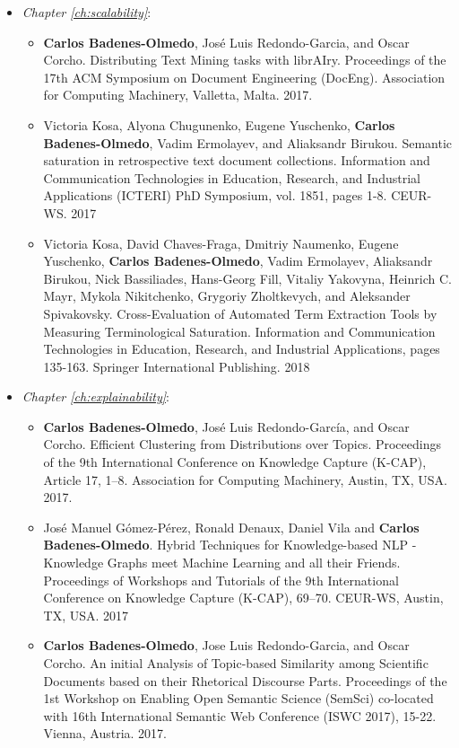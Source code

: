 \begin{itemize}
\item \textit{Chapter \ref{ch:scalability}}:
\begin{itemize}
\item \textbf{Carlos Badenes-Olmedo}, José Luis Redondo-Garcia, and Oscar Corcho. Distributing Text Mining tasks with librAIry. Proceedings of the 17th ACM Symposium on Document Engineering (DocEng). Association for Computing Machinery, Valletta, Malta. 2017.
\item Victoria Kosa, Alyona Chugunenko, Eugene Yuschenko, \textbf{Carlos Badenes-Olmedo}, Vadim Ermolayev, and Aliaksandr Birukou. Semantic saturation in retrospective text document collections. Information and Communication Technologies in Education, Research, and Industrial Applications (ICTERI) PhD Symposium, vol. 1851, pages 1-8. CEUR-WS. 2017
\item Victoria Kosa, David Chaves-Fraga, Dmitriy Naumenko, Eugene Yuschenko, \textbf{Carlos Badenes-Olmedo}, Vadim Ermolayev, Aliaksandr Birukou, Nick Bassiliades, Hans-Georg Fill, Vitaliy Yakovyna, Heinrich C. Mayr, Mykola Nikitchenko, Grygoriy Zholtkevych, and Aleksander Spivakovsky. Cross-Evaluation of Automated Term Extraction Tools by Measuring Terminological Saturation. Information and Communication Technologies in Education, Research, and Industrial Applications, pages 135-163. Springer International Publishing. 2018
\end{itemize}
\item \textit{Chapter \ref{ch:explainability}}:
\begin{itemize}
\item \textbf{Carlos Badenes-Olmedo}, José Luis Redondo-García, and Oscar Corcho. Efficient Clustering from Distributions over Topics. Proceedings of the 9th International Conference on Knowledge Capture (K-CAP), Article 17, 1–8. Association for Computing Machinery, Austin, TX, USA. 2017.
\item José Manuel Gómez-Pérez, Ronald Denaux, Daniel Vila and \textbf{Carlos Badenes-Olmedo}. Hybrid Techniques for Knowledge-based NLP - Knowledge Graphs meet Machine Learning and all their Friends. Proceedings of Workshops and Tutorials of the 9th International Conference on Knowledge Capture (K-CAP), 69–70. CEUR-WS, Austin, TX, USA. 2017
\item \textbf{Carlos Badenes-Olmedo}, Jose Luis Redondo-Garcia, and Oscar Corcho. An initial Analysis of Topic-based Similarity among Scientific Documents based on their Rhetorical Discourse Parts. Proceedings of the 1st Workshop on Enabling Open Semantic Science (SemSci) co-located with 16th International Semantic Web Conference (ISWC 2017), 15-22. Vienna, Austria. 2017.

\end{itemize}
\end{itemize}
